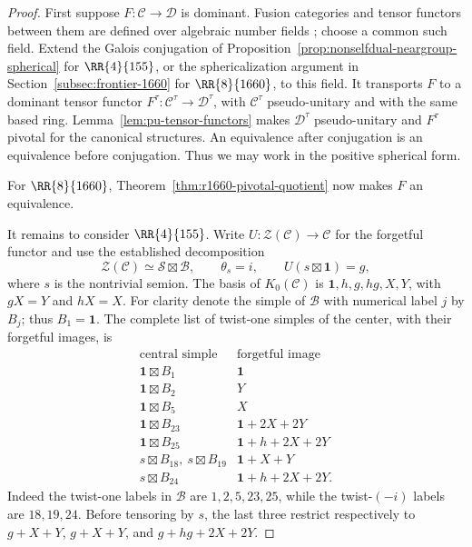 \begin{proof}
First suppose $F\colon\mathcal C\to\mathcal D$ is dominant.
Fusion categories and tensor functors between them are defined over
algebraic number fields \cite[Corollary~9.1.8]{EGNO}; choose a common
such field. Extend the Galois conjugation of
Proposition~\ref{prop:nonselfdual-neargroup-spherical} for $\RR{4}{155}$,
or the sphericalization argument in Section~\ref{subsec:frontier-1660}
for $\RR{8}{1660}$, to this field. It transports
$F$ to a dominant tensor functor $F^\tau\colon\mathcal C^\tau\to
\mathcal D^\tau$, with $\mathcal C^\tau$ pseudo-unitary and with the
same based ring. Lemma~\ref{lem:pu-tensor-functors} makes
$\mathcal D^\tau$ pseudo-unitary and $F^\tau$ pivotal for the canonical
structures. An equivalence after conjugation is an equivalence before
conjugation. Thus we may work in the positive spherical form.

For $\RR{8}{1660}$, Theorem~\ref{thm:r1660-pivotal-quotient} now makes
$F$ an equivalence.

It remains to consider $\RR{4}{155}$. Write
$U:\mathcal Z(\mathcal C)\to\mathcal C$ for the forgetful functor and
use the established decomposition
\[
 \mathcal Z(\mathcal C)\simeq\mathcal S\boxtimes\mathcal B,
 \qquad \theta_s=i,\qquad U(s\boxtimes\mathbf1)=g,
\]
where $s$ is the nontrivial semion. The basis of $K_0(\mathcal C)$ is
$\mathbf1,h,g,hg,X,Y$, with $gX=Y$ and $hX=X$.
For clarity denote the simple of $\mathcal B$ with numerical label $j$
by $B_j$; thus $B_1=\mathbf1$.
The complete list of twist-one simples of the center, with their
forgetful images, is
\begin{equation}\label{eq:r155-twist-one-restrictions}
\begin{array}{c|l}
\text{central simple}&\text{forgetful image}\\ \hline
 \mathbf1\boxtimes B_1&\mathbf1\\
 \mathbf1\boxtimes B_2&Y\\
 \mathbf1\boxtimes B_5&X\\
 \mathbf1\boxtimes B_{23}&\mathbf1+2X+2Y\\
 \mathbf1\boxtimes B_{25}&\mathbf1+h+2X+2Y\\
 s\boxtimes B_{18},\ s\boxtimes B_{19}&\mathbf1+X+Y\\
 s\boxtimes B_{24}&\mathbf1+h+2X+2Y.
\end{array}
\end{equation}
Indeed the twist-one labels in $\mathcal B$ are $1,2,5,23,25$, while
the twist-$(-i)$ labels are $18,19,24$. Before tensoring by $s$, the
last three restrict respectively to $g+X+Y$, $g+X+Y$, and
$g+hg+2X+2Y$.


\end{proof}
